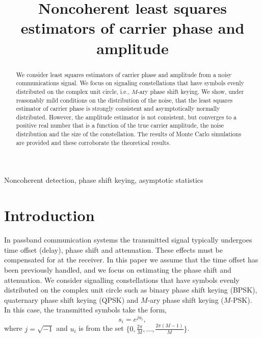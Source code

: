 \documentclass{article}
\title{Noncoherent least squares estimators of carrier phase and amplitude}
\begin{document}
\maketitle

\begin{abstract}
We consider least squares estimators of carrier phase and amplitude from a noisy communications signal.  We focus on signaling constellations that have symbols evenly distributed on the complex unit circle, i.e., $M$-ary phase shift keying.  We show, under reasonably mild conditions on the distribution of the noise, that the least squares estimator of carrier phase is strongly consistent and asymptotically normally distributed.  However, the amplitude estimator is not consistent, but converges to a positive real number that is a function of the true carrier amplitude, the noise distribution and the size of the constellation.  The results of Monte Carlo simulations are provided and these corroborate the theoretical results.
\end{abstract}
\begin{keywords}
Noncoherent detection, phase shift keying, asymptotic statistics
\end{keywords}

\section{Introduction}

\newcommand{\calC}{\mathcal C}

In passband communication systems the transmitted signal typically undergoes time offset (delay), phase shift and attenuation.  These effects must be compensated for at the receiver. In this paper we assume that the time offset has been previously handled, and we focus on estimating the phase shift and attenuation.  We consider signalling constellations that have symbols evenly distributed on the complex unit circle such as binary phase shift keying (BPSK), quaternary phase shift keying (QPSK) and $M$-ary phase shift keying ($M$-PSK).  In this case, the transmitted symbols take the form,
\[
s_i = e^{j u_i},
\]
where $j = \sqrt{-1}$ and $u_i$ is from the set $\{0, \tfrac{2\pi}{M}, \dots, \tfrac{2\pi(M-1)}{M}\}$. %
\end{document}
